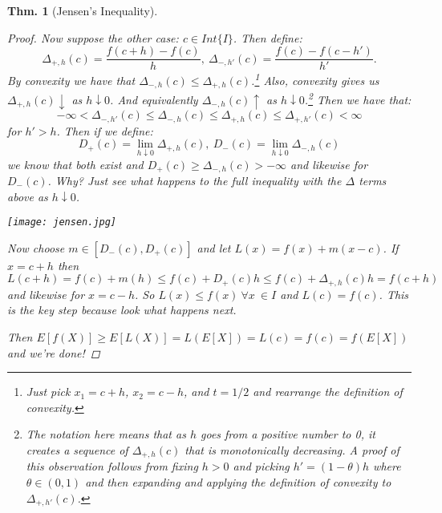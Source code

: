\documentclass{tufte-book}
\theoremstyle{mytheoremstyle}
\newtheorem*{thm}{Thm.}
\theoremstyle{mylemstyle}
\theoremstyle{mydefstyle}
\begin{document}
\begin{thm}[Jensen's Inequality]
\begin{proof}
		Now suppose the other case: \(c \in Int\{I\}\). Then define:
			\[\Delta_{+, h}(c) = \frac{f(c + h) - f(c)}{h},\ \Delta_{-, h'}(c) = \frac{f(c) - f(c - h')}{h'} \text{.}\]
		By convexity we have that \(\Delta_{-, h}(c) \le \Delta_{+, h}(c)\).\footnote{Just pick \(x_1 = c+ h\), \(x_2 = c - h\), and \(t = 1/2\) and rearrange the definition of convexity.} Also, convexity gives us \(\Delta_{+, h}(c) \downarrow\) as \(h \downarrow 0\). And equivalently \(\Delta_{-, h}(c) \uparrow\) as \(h \downarrow 0\).\footnote{The notation here means that as \(h\) goes from a positive number to 0, it creates a sequence of \(\Delta_{+, h}(c)\) that is monotonically decreasing. A proof of this observation follows from fixing \(h > 0\) and picking \(h' = (1- \theta)h\) where \(\theta \in (0, 1)\) and then expanding and applying the definition of convexity to \(\Delta_{+, h'}(c)\).} Then we have that:
			\[-\infty < \Delta_{-, h'}(c) \le \Delta_{-, h}(c) \le \Delta_{+, h}(c) \le \Delta_{+, h'}(c) < \infty\]
		for \(h' > h\). Then if we define:
			\[D_{+}(c) = \lim_{h \downarrow 0} \Delta_{+, h}(c),\ D_{-}(c) = \lim_{h \downarrow 0} \Delta_{-, h}(c)\]
		we know that both exist and \(D_{+}(c) \ge \Delta_{-, h}(c) > - \infty\) and likewise for \(D_{-}(c)\). Why? Just see what happens to the full inequality with the \(\Delta\) terms above as \(h \downarrow 0\). 
		\begin{marginfigure}[1in]
			\texttt{[image: jensen.jpg]}
			\caption{Johan Jensen in his later years.} 
		\end{marginfigure}
		Now choose \(m \in [D_{-}(c), D_{+}(c)]\) and let \(L(x) = f(x) + m(x- c)\). If \(x = c+ h\) then \(L(c + h) = f(c) + m(h) \le f(c) + D_{+}(c)h \le f(c) + \Delta_{+, h}(c)h = f(c + h)\) and likewise for \(x = c - h\). So \(L(x) \le f(x)\ \forall x\ \in I\) and \(L(c) = f(c)\). This is the key step because look what happens next.
		
		Then \(E[f(X)] \ge E[L(X)] = L(E[X]) = L(c) = f(c) = f(E[X])\) and we're done! 
	\end{proof}
\end{thm}
\end{document}
